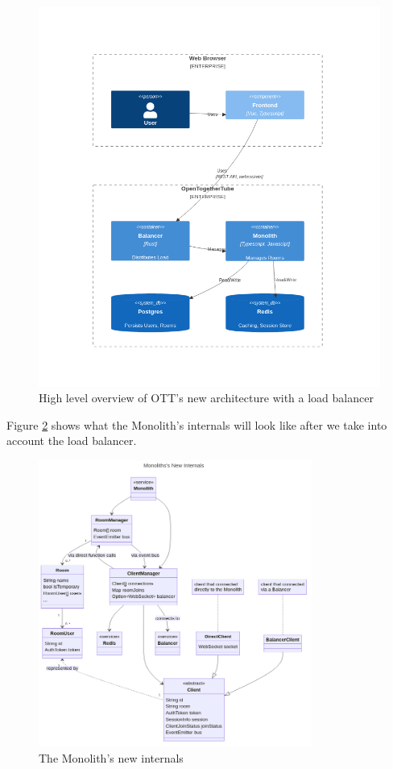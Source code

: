\begin{figure}[!h]
  \centering
  \includegraphics[width=1\textwidth]{Figures/deployment-new.png}
  \caption{High level overview of OTT's new architecture with a load balancer}
  \label{Figure::deployment-new}
\end{figure}

Figure \ref{Figure::monolith-class-new} shows what the Monolith's internals will look like after we take into account the load balancer.

\begin{figure}[!h]
  \centering
  \includegraphics[width=0.8\textwidth]{Figures/monolith-class-new.png}
  \caption{The Monolith's new internals}
  \label{Figure::monolith-class-new}
\end{figure}


